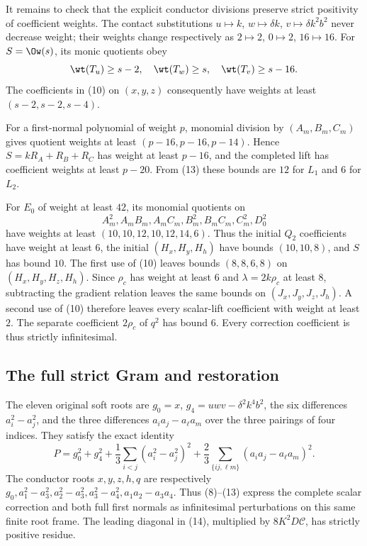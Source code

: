 It remains to check that the explicit conductor divisions preserve
strict positivity of coefficient weights. The contact substitutions
$u\mapsto k$, $w\mapsto\delta k$, $v\mapsto\delta k^2b^2$
never decrease weight; their weights change respectively as
$2\mapsto2$, $0\mapsto2$, $16\mapsto16$.
For $S=\Ow(s)$, its monic quotients obey
\[
 \wt(T_u)\geq s-2,\quad \wt(T_w)\geq s,\quad
 \wt(T_v)\geq s-16.
\]
The coefficients in (10) on $(x,y,z)$ consequently have weights
at least $(s-2,s-2,s-4)$.

For a first-normal polynomial of weight $p$, monomial division by
$(A_m,B_m,C_m)$ gives quotient weights at least
$(p-16,p-16,p-14)$. Hence $S=kR_A+R_B+R_C$ has weight at least
$p-16$, and the completed lift has coefficient weights at least
$p-20$. From (13) these bounds are $12$ for $L_1$ and $6$ for $L_2$.

For $E_0$ of weight at least $42$, its monomial quotients on
\[
 A_m^2,A_mB_m,A_mC_m,B_m^2,B_mC_m,C_m^2,D_0^2
\]
have weights at least $(10,10,12,10,12,14,6)$. Thus the initial
$Q_2$ coefficients have weight at least $6$, the initial
$(H_x,H_y,H_h)$ have bounds $(10,10,8)$, and $S$ has bound $10$.
The first use of (10) leaves bounds $(8,8,6,8)$ on
$(H_x,H_y,H_z,H_h)$. Since $\rho_c$ has weight at least $6$ and
$\lambda=2k\rho_c$ at least $8$, subtracting the gradient relation
leaves the same bounds on $(J_x,J_y,J_z,J_h)$. A second use of
(10) therefore leaves every scalar-lift coefficient with weight at
least $2$. The separate coefficient $2\rho_c$ of $q^2$ has bound
$6$. Every correction coefficient is thus strictly infinitesimal.

\subsection{The full strict Gram and restoration}

The eleven original soft roots are $g_0=x$, $g_4=uwv-\delta^2k^4b^2$,
the six differences $a_i^2-a_j^2$, and the three differences
$a_ia_j-a_\ell a_m$ over the three pairings of four indices.
They satisfy the exact identity
\begin{equation}
 P=g_0^2+g_4^2+\frac13\sum_{i<j}(a_i^2-a_j^2)^2
       +\frac23\sum_{\{ij,\ell m\}}(a_ia_j-a_\ell a_m)^2. \tag{14}
\end{equation}
The conductor roots $x,y,z,h,q$ are respectively
$g_0,a_1^2-a_3^2,a_2^2-a_3^2,a_3^2-a_4^2,a_1a_2-a_3a_4$.
Thus (8)--(13) express the complete scalar correction and both full
first normals as infinitesimal perturbations on this same finite
root frame. The leading diagonal in (14), multiplied by
$8K^2D\mathcal C$, has strictly positive residue.

